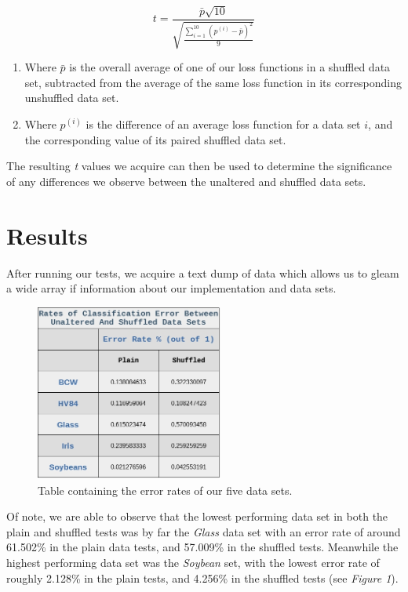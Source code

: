 \documentclass[twoside,11pt]{article}
\begin{document}
	\begin{equation}
		t = \frac{\bar{p}\sqrt{10}}{\sqrt{\frac{\sum_{i=1}^{10}(p^{(i)}-\bar{p})^2}{9}}}
	\end{equation}
	
	\begin{enumerate}
		\item Where $\bar{p}$ is the overall average of one of our loss functions in a shuffled data set, subtracted from the average of the same loss function in its corresponding unshuffled data set.
		\item Where $p^{(i)}$ is the difference of an average loss function for a data set $i$, and the corresponding value of its paired shuffled data set.
	\end{enumerate}

	The resulting \textit{t} values we acquire can then be used to determine the significance of any differences we observe between the unaltered and shuffled data sets.
	
	\section{Results}\label{sec:results}
	After running our tests, we acquire a text dump of data which allows us to gleam a wide array if information about our implementation and data sets. 
	
	
	\begin{figure}
		\centering
		\includegraphics[width=0.55\textwidth]{error_data.jpg}
		\caption{\label{fig:1} Table containing the error rates of our five data sets.}
	\end{figure}

	Of note, we are able to observe that the lowest performing data set in both the plain and shuffled tests was by far the \textit{Glass} data set with an error rate of around 61.502\% in the plain data tests, and 57.009\% in the shuffled tests. Meanwhile the highest performing data set was the \textit{Soybean} set, with the lowest error rate of roughly 2.128\% in the plain tests, and 4.256\% in the shuffled tests (see \textit{Figure 1}).
	
\end{document}
